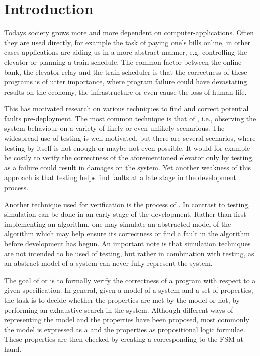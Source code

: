 \newpage
\section{Introduction}
Todays society grows more and more dependent on computer-applications. Often they are used directly, for example the task of paying one's bills online, in other cases applications are aiding us in a more abstract manner, e.g. controlling the elevator or planning a train schedule. The common factor between the online bank, the elevator relay and the train scheduler is that the correctness of these programs is of utter importance, where program failure could have devastating results on the economy, the infrastructure or even cause the loss of human life.

This has motivated research on various techniques to find and correct potential faults pre-deployment. The most common technique is that of , i.e., observing the system behaviour on a variety of likely or even unlikely scenarious. The widespread use of testing is well-motivated, but there are several scenarios, where testing by itself is not enough or maybe not even possible. It would for example be costly to verify the correctness of the aforementioned elevator only by testing, as a failure could result in damages on the system. Yet another weakness of this approach is that testing helps find faults at a late stage in the development process.

Another technique used for verification is the process of . In contrast to testing, simulation can be done in an early stage of the development. Rather than first implementing an algorithm, one may simulate an abstracted model of the algorithm which may help ensure its correctness or find a fault in the algorithm before development has begun. An important note is that simulation techniques are not intended to be used  of testing, but rather in combination with testing, as an abstract model of a system can never fully represent the system.

The goal of  or  is to formally verify the correctness of a program with respect to a given specification. In general, given a model of a system and a set of properties, the task is to decide whether the properties are met by the model or not, by performing an exhaustive search in the system. Although different ways of representing the model and the properties have been proposed, most commonly the model is expressed as a  and the properties as propositional logic formulae. These properties are then checked by creating a  corresponding to the FSM at hand.

